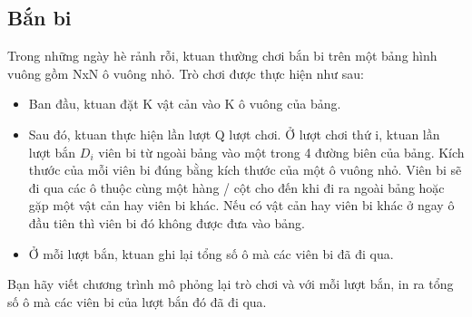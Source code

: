 \subsection{   Bắn bi  }

   Trong những ngày hè rảnh rỗi, ktuan thường chơi bắn bi trên một bảng hình vuông gồm NxN ô vuông nhỏ. Trò chơi được thực hiện như sau:  
\begin{itemize}
	\item     Ban đầu, ktuan đặt K vật cản vào K ô vuông của bảng.   
	\item     Sau đó, ktuan thực hiện lần lượt Q lượt chơi. Ở lượt chơi thứ i, ktuan lần lượt bắn $D_{i}$    viên bi từ ngoài bảng vào một trong 4 đường biên của bảng. Kích thước của mỗi viên bi đúng bằng kích thước của một ô vuông nhỏ. Viên bi sẽ đi qua các ô thuộc cùng một hàng / cột cho đến khi đi ra ngoài bảng hoặc gặp một vật cản hay viên bi khác. Nếu có vật cản hay viên bi khác ở ngay ô đầu tiên thì viên bi đó không được đưa vào bảng.   
	\item     Ở mỗi lượt bắn, ktuan ghi lại tổng số ô mà các viên bi đã đi qua.   
\end{itemize}

   Bạn hãy viết chương trình mô phỏng lại trò chơi và với mỗi lượt bắn, in ra tổng số ô mà các viên bi của lượt bắn đó đã đi qua.